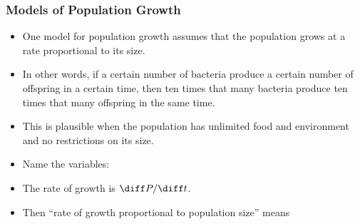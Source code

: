 \begin{frame}
\frametitle{Models of Population Growth}
\begin{itemize}
\item  One model for population growth assumes that the population grows at a rate proportional to its size.
\item  In other words, if a certain number of bacteria produce a certain number of offspring in a certain time, then ten times that many bacteria produce ten times that many offspring in the same time.
\item  This is plausible when the population has unlimited food and environment and no restrictions on its size.
\item<2->  Name the variables:
%
\item<3->  The rate of growth is $\diff P/\diff t$.
\item<4->  Then ``rate of growth proportional to population size'' means
\end{itemize}
%
\end{frame}
